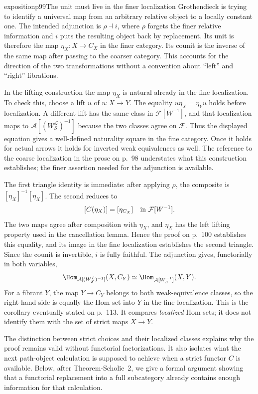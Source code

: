 \begin{dcomment}{exposition}{p99}{The unit must live in the finer localization}
Grothendieck is trying to identify a universal map from an arbitrary relative object to a locally constant one. The intended adjunction is $\rho\dashv i$, where $\rho$ forgets the finer relative information and $i$ puts the resulting object back by replacement. Its unit is therefore the map $\eta_X:X\to C_X$ in the finer category. Its counit is the inverse of the same map after passing to the coarser category. This accounts for the direction of the two transformations without a convention about ``left'' and ``right'' fibrations.

In the lifting construction the map $\eta_X$ is natural already in the fine localization. To check this, choose a lift $\bar u$ of $u:X\to Y$. The equality $\bar u\eta_X=\eta_Yu$ holds before localization. A different lift has the same class in $\mathcal F[W^{-1}]$, and that localization maps to $\mathcal A[(W_S^{\mathcal L})^{-1}]$ because the two classes agree on $\mathcal F$. Thus the displayed equation gives a well-defined naturality square in the fine category. Once it holds for actual arrows it holds for inverted weak equivalences as well. The reference to the coarse localization in the prose on p.~98 understates what this construction establishes; the finer assertion needed for the adjunction is available.

The first triangle identity is immediate: after applying $\rho$, the composite is $[\eta_X]^{-1}[\eta_X]$. The second reduces to
\[
[C(\eta_X)]=[\eta_{C_X}]
\quad\hbox{in }\mathcal F[W^{-1}].
\]
The two maps agree after composition with $\eta_X$, and $\eta_X$ has the left lifting property used in the cancellation lemma. Hence the proof on p.~100 establishes this equality, and its image in the fine localization establishes the second triangle. Since the counit is invertible, $i$ is fully faithful. The adjunction gives, functorially in both variables,
\[
\Hom_{\mathcal A[(W_S^{\mathcal L})^{-1}]}(X,C_Y)
\simeq
\Hom_{\mathcal A[W_S^{-1}]}(X,Y).
\]
For a fibrant $Y$, the map $Y\to C_Y$ belongs to both weak-equivalence classes, so the right-hand side is equally the Hom set into $Y$ in the fine localization. This is the corollary eventually stated on p.~113. It compares \emph{localized} Hom sets; it does not identify them with the set of strict maps $X\to Y$.

The distinction between strict choices and their localized classes explains why the proof remains valid without functorial factorizations. It also isolates what the next path-object calculation is supposed to achieve when a strict functor $C$ is available. Below, after Theorem-Scholie~2, we give a formal argument showing that a functorial replacement into a full subcategory already contains enough information for that calculation.
\end{dcomment}

